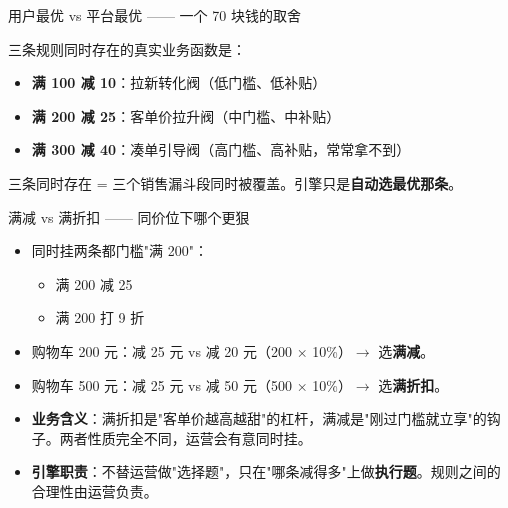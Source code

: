 \documentclass[aspectratio=169,11pt]{beamer}
\begin{document}
\begin{frame}[shrink]{用户最优 vs 平台最优 —— 一个 70 块钱的取舍}
\vspace{2mm}
\small 三条规则同时存在的真实业务函数是：
\begin{itemize}
  \item \textbf{满 100 减 10}：拉新转化阀（低门槛、低补贴）
  \item \textbf{满 200 减 25}：客单价拉升阀（中门槛、中补贴）
  \item \textbf{满 300 减 40}：凑单引导阀（高门槛、高补贴，常常拿不到）
\end{itemize}
三条同时存在 = 三个销售漏斗段同时被覆盖。引擎只是\textbf{自动选最优那条}。
\end{frame}

\begin{frame}[shrink]{满减 vs 满折扣 —— 同价位下哪个更狠}
\begin{itemize}
  \item 同时挂两条都门槛"满 200"：
  \begin{itemize}
    \item 满 200 减 25
    \item 满 200 打 9 折
  \end{itemize}
  \item 购物车 200 元：减 25 元 vs 减 20 元（200 × 10\%）$\to$ 选\textbf{满减}。
  \item 购物车 500 元：减 25 元 vs 减 50 元（500 × 10\%）$\to$ 选\textbf{满折扣}。
  \item \textbf{业务含义}：满折扣是"客单价越高越甜"的杠杆，满减是"刚过门槛就立享"的钩子。两者性质完全不同，运营会有意同时挂。
  \item \textbf{引擎职责}：不替运营做"选择题"，只在"哪条减得多"上做\textbf{执行题}。规则之间的合理性由运营负责。
\end{itemize}
\end{frame}
\end{document}
